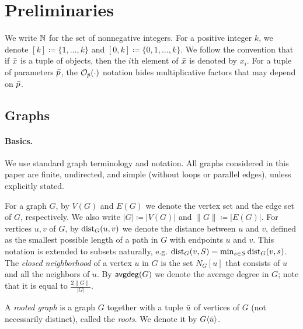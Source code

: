 \section{Preliminaries}\label{sec:prelims}

We write $\mathbb{N}$ for the set of nonnegative integers.
For a positive integer $k$, we denote $[k]\coloneqq \{1,\ldots,k\}$ and $[0,k]\coloneqq \{0,1,\ldots,k\}$.
We follow the convention that if ${\bar{x}}$ is a tuple of objects, then the $i$th element of ${\bar{x}}$ is denoted by $x_i$. For a tuple of parameters ${\bar{p}}$, the $\mathcal{O}_{{\bar{p}}}(\cdot)$ notation hides multiplicative factors that may depend on ${\bar{p}}$.

\subsection{Graphs}

\paragraph{Basics.} We use standard graph terminology and notation. All graphs considered in this paper are finite, undirected, and simple (without loops or parallel edges), unless explicitly stated.

For a graph $G$, by $V(G)$ and $E(G)$ we denote the vertex set and the edge set of $G$, respectively. We also write $|G| \coloneqq |V(G)|$ and $\|G\| \coloneqq |E(G)|$. For vertices $u,v$ of $G$, by $\mathrm{dist}_G(u,v)$ we denote the distance between $u$ and $v$, defined as the smallest possible length of a path in $G$ with endpoints $u$ and $v$. This notation is extended to subsets naturally, e.g. $\mathrm{dist}_G(v,S)=\min_{s\in S}\mathrm{dist}_G(v,s)$. The \emph{closed neighborhood} of a vertex $u$ in $G$ is the set $N_G[u]$ that consists of $u$ and all the neighbors of $u$. By $\mathsf{avgdeg}(G)$ we denote the average degree in $G$; note that it is equal to $\frac{2\|G\|}{|G|}$.

A \emph{rooted graph} is a graph $G$ together with a tuple ${\bar{u}}$ of vertices of $G$ (not necessarily distinct), called the \emph{roots}. We denote it by $G\langle {\bar{u}}\rangle$. 


